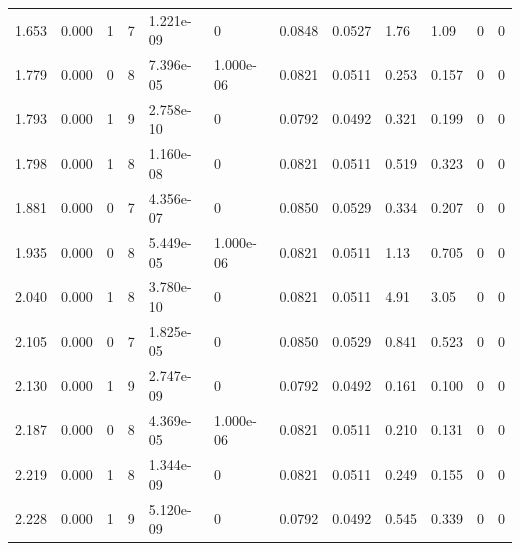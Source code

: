 \documentclass[preview]{standalone}
\begin{document}
{{\begin{tabular}{L{1.2cm}C{1.2cm} C{0.3cm}C{0.5cm} C{1.4cm}C{1.4cm} C{1.4cm}C{1.4cm} C{1.6cm}C{1.6cm} C{1.6cm}C{1.6cm}}
  1.653  &  0.000  & 1     &  7 &  1.221e-09  & 0  &  0.0848&   0.0527& 1.76 & 1.09   &  0 & 0  \\ 
  1.779  &  0.000  & 0     &  8 &  7.396e-05  & 1.000e-06  &  0.0821&   0.0511& 0.253 & 0.157   &  0 & 0  \\ 
  1.793  &  0.000  & 1     &  9 &  2.758e-10  & 0  &  0.0792&   0.0492& 0.321 & 0.199   &  0 & 0  \\ 
  1.798  &  0.000  & 1     &  8 &  1.160e-08  & 0  &  0.0821&   0.0511& 0.519 & 0.323   &  0 & 0  \\ 
  1.881  &  0.000  & 0     &  7 &  4.356e-07  & 0  &  0.0850&   0.0529& 0.334 & 0.207   &  0 & 0  \\ 
  1.935  &  0.000  & 0     &  8 &  5.449e-05  & 1.000e-06  &  0.0821&   0.0511& 1.13 & 0.705   &  0 & 0  \\ 
  2.040  &  0.000  & 1     &  8 &  3.780e-10  & 0  &  0.0821&   0.0511& 4.91 & 3.05   &  0 & 0  \\ 
  2.105  &  0.000  & 0     &  7 &  1.825e-05  & 0  &  0.0850&   0.0529& 0.841 & 0.523   &  0 & 0  \\ 
  2.130  &  0.000  & 1     &  9 &  2.747e-09  & 0  &  0.0792&   0.0492& 0.161 & 0.100   &  0 & 0  \\ 
  2.187  &  0.000  & 0     &  8 &  4.369e-05  & 1.000e-06  &  0.0821&   0.0511& 0.210 & 0.131   &  0 & 0  \\ 
  2.219  &  0.000  & 1     &  8 &  1.344e-09  & 0  &  0.0821&   0.0511& 0.249 & 0.155   &  0 & 0  \\ 
  2.228  &  0.000  & 1     &  9 &  5.120e-09  & 0  &  0.0792&   0.0492& 0.545 & 0.339   &  0 & 0  \\ 
\hline 
\end{tabular} 

}}
\end{document}
